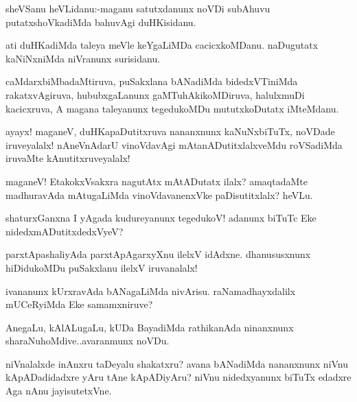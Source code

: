 \documentclass{article}
\begin{document}

\begin{mn}%
sheVSanu heVLidanu:-maganu satutxdanunx noVDi subAhuvu putatxshoVkadiMda bahuvAgi 
duHKisidanu.
\end{mn}

\begin{mn}%
ati duHKadiMda taleya meVle keYgaLiMDa cacicxkoMDanu. naDugutatx kaNiNxniMda niVranunx 
surisidanu.
\end{mn}

\begin{mn}%
caMdarxbiMbadaMtiruva, puSakxlana bANadiMda bidedxVTiniMda rakatxvAgiruva, hububxgaLanunx 
gaMTuhAkikoMDiruva, halulxmuDi kacicxruva, A magana taleyanunx tegedukoMDu  mututxkoDutatx 
iMteMdanu.
\end{mn}

\begin{mn}%
ayayx! maganeV, duHKapaDutitxruva nananxnunx kaNuNxbiTuTx, noVDade iruveyalalx! 
nAneVnAdarU vinoVdavAgi mAtanADutitxlalxveMdu roVSadiMda iruvaMte kAnutitxruveyalalx!
\end{mn}

\begin{mn}%
maganeV! EtakokxVsakxra nagutAtx mAtADutatx ilalx? amaqtadaMte madhuravAda mAtugaLiMda 
vinoVdavanenxVke paDisutitxlalx? heVLu.
\end{mn}

\begin{mn}%
shaturxGanxna I yAgada kudureyanunx tegedukoV! adanunx biTuTc Eke nidedxmADutitxdedxVyeV?
\end{mn}

\begin{mn}%
parxtApashaliyAda parxtApAgarxyXnu ilelxV idAdxne. dhanususxnunx hiDidukoMDu puSakxlanu 
ilelxV iruvanalalx!
\end{mn}

\begin{mn}%
ivananunx kUrxravAda bANagaLiMda nivArisu. raNamadhayxdalilx mUCeRyiMda Eke samamxniruve?
\end{mn}


\begin{mn}%
AnegaLu, kAlALugaLu, kUDa BayadiMda rathikanAda ninanxnunx sharaNuhoMdive..avaranmunx noVDu.
\end{mn}

\begin{mn}%
 niVnalalxde inAnxru taDeyalu shakatxru? avana 
bANadiMda nananxnunx niVnu kApADadidadxre yAru tAne kApADiyAru? niVnu nidedxyanunx biTuTx 
edadxre Aga nAnu jayisutetxVne.
\end{mn}
\end{document}
